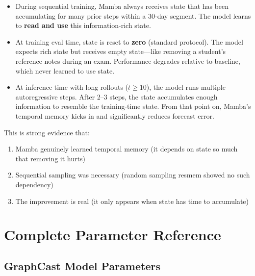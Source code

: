 \documentclass[11pt,a4paper]{article}
\begin{document}
\begin{itemize}
  \item During sequential training, Mamba always receives state that has been accumulating for many prior steps within a 30-day segment. The model learns to \textbf{read and use} this information-rich state.

  \item At training eval time, state is reset to \textbf{zero} (standard protocol). The model expects rich state but receives empty state---like removing a student's reference notes during an exam. Performance degrades relative to baseline, which never learned to use state.

  \item At inference time with long rollouts ($t \geq 10$), the model runs multiple autoregressive steps. After 2--3 steps, the state accumulates enough information to resemble the training-time state. From that point on, Mamba's temporal memory kicks in and significantly reduces forecast error.
\end{itemize}

This is strong evidence that:
\begin{enumerate}[nosep]
  \item Mamba genuinely learned temporal memory (it depends on state so much that removing it hurts)
  \item Sequential sampling was necessary (random sampling resmem showed no such dependency)
  \item The improvement is real (it only appears when state has time to accumulate)
\end{enumerate}

\section{Complete Parameter Reference}

\subsection{GraphCast Model Parameters}
\end{document}
